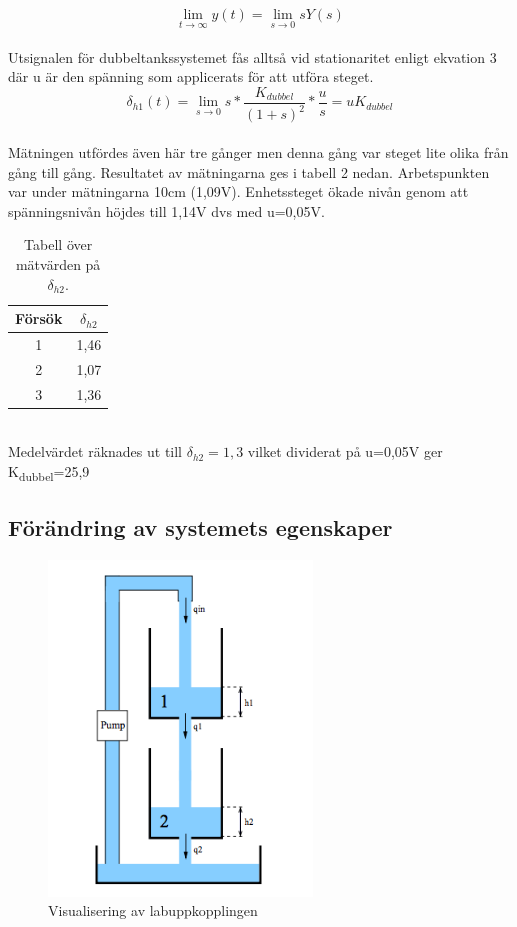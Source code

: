 \documentclass{article}
\begin{document}
\begin{equation}
\lim\limits_{t \to \infty}y(t) = \lim\limits_{s \to 0}sY(s)
\end{equation}
\pagebreak
\\
Utsignalen för dubbeltankssystemet fås alltså vid stationaritet enligt ekvation 3 där u är den spänning som applicerats för att utföra steget. 
\begin{equation}
\delta_{h1}(t)=\lim\limits_{s \to 0}s*\frac{K_{dubbel}}{(1+s)^2}*\frac{u}{s}=uK_{dubbel}
\end{equation}
\\
Mätningen utfördes även här tre gånger men denna gång var steget lite olika från gång till gång. Resultatet av mätningarna ges i tabell 2 nedan. Arbetspunkten var under mätningarna 10cm (1,09V). Enhetssteget ökade nivån genom att spänningsnivån höjdes till 1,14V dvs med u=0,05V. 

\begin{table}[ht] 
\centering 
\begin{tabular}{c c} 
Försök & $\delta_{h2}$ \\ [0.5ex] %
\hline
1 & 1,46 \\
2 & 1,07 \\
3 & 1,36 \\

\end{tabular} 
\caption{Tabell över mätvärden på $\delta_{h2}$.}
\end{table}
~\\ %
Medelvärdet räknades ut till $\delta_{h2}=1,3$ vilket dividerat på u=0,05V ger K\textsubscript{dubbel}=25,9


\subsection{Förändring av systemets egenskaper}


\begin{figure}[ht!]
\centering
\includegraphics[width=70mm]{System.png}
\caption{Visualisering av labuppkopplingen}
\label{overflow}
\end{figure}
\end{document}
